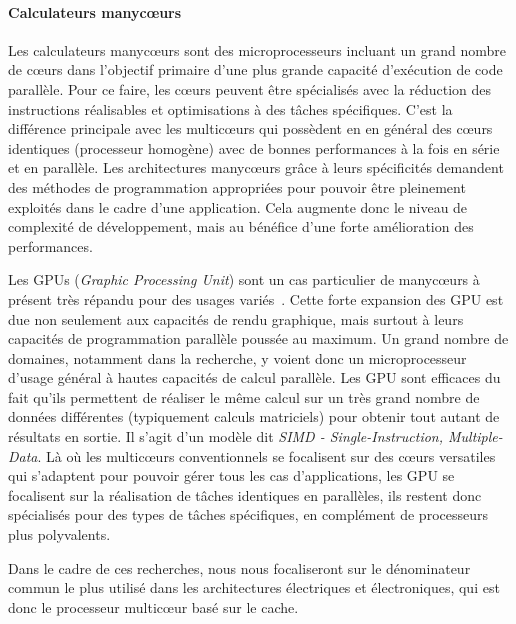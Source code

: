 \documentclass[french, a4paper, 11pt, twoside, pdftex]{StyleThese}
\begin{document}
		\paragraph{Calculateurs manycœurs}	Les calculateurs manycœurs sont des microprocesseurs incluant un grand nombre de cœurs dans l'objectif primaire d'une plus grande capacité d'exécution de code parallèle. Pour ce faire, les cœurs peuvent être spécialisés avec la réduction des instructions réalisables et optimisations à des tâches spécifiques. C'est la différence principale avec les multicœurs qui possèdent en en général des cœurs identiques (processeur homogène) avec de bonnes performances à la fois en série et en parallèle. 
		Les architectures manycœurs grâce à leurs spécificités demandent  des méthodes de programmation appropriées pour pouvoir être pleinement exploités dans le cadre d'une application. Cela augmente donc le niveau de complexité de développement, mais au bénéfice d'une forte amélioration des performances.
		
		Les GPUs (\emph{Graphic Processing Unit}) sont un cas particulier de manycœurs à présent très répandu pour des usages variés~\cite{owens2008gpu}. Cette forte expansion des GPU est due non seulement aux capacités de rendu graphique, mais surtout à leurs capacités de programmation parallèle poussée au maximum. Un grand nombre de domaines, notamment dans la recherche, y voient donc un microprocesseur d'usage général à hautes capacités de calcul parallèle.
		Les GPU sont efficaces du fait qu'ils permettent de réaliser le même calcul sur un très grand nombre de données différentes (typiquement calculs matriciels) pour obtenir tout autant de résultats en sortie. Il s'agit d'un modèle dit \emph{SIMD - Single-Instruction, Multiple-Data}. Là où les multicœurs conventionnels se focalisent sur des cœurs versatiles qui s'adaptent pour pouvoir gérer tous les cas d'applications, les GPU se focalisent sur la réalisation de tâches identiques en parallèles, ils restent donc spécialisés pour des types de tâches spécifiques, en complément de processeurs plus polyvalents.
		
		Dans le cadre de ces recherches, nous nous focaliseront sur le dénominateur commun le plus utilisé dans les architectures électriques et électroniques, qui est donc le processeur multicœur basé sur le cache.
		
\end{document}
